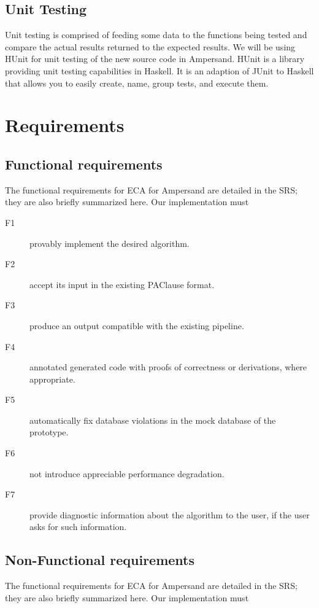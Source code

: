 \documentclass[12pt]{report}
\begin{document}
\subsection{Unit Testing}\label{subsec:UnitTest}
Unit testing is comprised of feeding some data to the functions being tested and
compare the actual results returned to the expected results.
We will be using HUnit for unit testing of the new source code 
in Ampersand. HUnit is a 
library providing unit testing capabilities in Haskell.  It is an adaption of 
JUnit to Haskell that allows you to easily create, name, group tests, and 
execute them.

\section{Requirements}\label{sec:Reqs}
\subsection{Functional requirements}\label{subsec:FunReqs}
The functional requirements for ECA for Ampersand are detailed in the SRS; they
are also briefly summarized here. Our implementation must

\begin{description}
\item[F1] provably implement the desired algorithm.
\item[F2] accept its input in the existing PAClause format.
\item[F3] produce an output compatible with the existing pipeline. 
\item[F4] annotated generated code with proofs of correctness or derivations,
where appropriate. 
\item[F5] automatically fix database violations in the mock database of the
prototype.
\item[F6] not introduce appreciable performance degradation. 
\item[F7] provide diagnostic information about the algorithm to
the user, if the user asks for such information.
\end{description}

\subsection{Non-Functional requirements}\label{subsec:NonFunReqs}
The functional requirements for ECA for Ampersand are detailed in the SRS; they
are also briefly summarized here. Our implementation must
\end{document}
